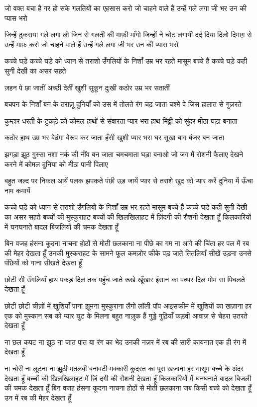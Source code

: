 जो वक्त बचा है गर हो सके
गलतियों का एहसास करो
जो चाहने वाले हैं उन्हें गले लगा
जी भर उन की प्यास भरो

जिन्हें ठुकराया गले लगा लो
जिन से गलती की माफ़ी माँगो
जिन्हों ने चोट लगायी दर्द दिया
दिलो दिमाग़ से उन्हें माफ़ करो
जो चाहने वाले हैं उन्हें गले लगा
जी भर उन की प्यास भरो
                           

कच्चे घड़े
कच्चे घड़े को ध्यान से तराशो
उँगलियों के निशाँ उम्र भर रहते
मासूम बच्चे हैं कच्चे घड़े
कही सुनी देखी का असर सहते

ज़हन पे छा जातीं
अच्छी देतीं खुशी सुकून
दुःखी कठोर उम्र भर सतातीं

बचपन के निशाँ बन के तराज़ू
दुनियाँ को उस में तोलते
रंग चढ़ जाता चश्मे पे
जिस हालात से गुज़रते

कुम्हार धरती के टुकड़े को
कोमल हाथों से संवारता
प्यार भरा हाथ मिट्टी को
सुंदर मीठा घड़ा बनाता

कठोर हाथ उम्र भर 
बेढंगा बेरूप कर जाता
हँसी खुशी प्यार भरा घर
सूखा बाग बंजर बन जाता

झगड़ा झूठ ग़ुस्सा नशा
नर्क की नींव बन जाता
चमचमाता घड़ा बनाओ
जो जग में रोशनी फैलाए
देखने करने में कोमल
दुनिया को मीठा पानी पिलाए

बहुत जल्द पर निकल आयें
पलक झपकते पंछी उड़ जायें
प्यार से तराशे खुद को प्यार करें
दुनिया में ऊँचा नाम कमायें

कच्चे घड़े को ध्यान से तराशो
उँगलियों के निशाँ उम्र भर रहते
मासूम बच्चे हैं कच्चे घड़े
कही सुनी देखी का असर सहते
बच्चों की मुस्कुराहट
बच्चों की खिलखिलाहट में ज़िंदगी की
रौशनी देखता हूँ
किलकारियों में घनघनाते बादल बिजलियों
की चमक देखता हूँ

बिन वजह हंसना कूदना नाचना
होठों से मोती छलकाना
ना पीछे का गम ना आगे की चिंता
हर पल में रब की मेहर देखता हूँ
उनकी मुस्कराहट के सामने
फूल कमज़ोर फीके पड़ जाते
तितलियाँ सीखें उड़ना उनसे
पंछियों को गाना सीखते देखता हूँ

छोटी सी उँगलियाँ हाथ पकड़
दिल तक पहुँच जाते
रूखे खूँखार इंसान का पत्थर दिल
मोम सा पिघलते देखता हूँ

छोटी छोटी चीज़ों में खुशियाँ पाना झूमना
मुस्कुराना
लैगो लॉली पॉप आइसक्रीम में खुशियों का
खज़ाना
हर एक को मुस्कान
सब को प्यार घुट के मिलना
बहुत नाज़ुक हैं गुड्डे गुढ़ियाँ
कड़वी आवाज़ से चेहरा उतरते देखता हूँ



ना छल कपट ना झूठ
ना जात पात या रंग का भेद
उनकी नज़र में रब की सारी कायनात
एक ही रंग में देखता हूँ

ना चोरी ना लूटना ना झूठी
मतलबी बनावटी मक्कारी
कुदरत का पूरा खज़ाना
हर मासूम बच्चे के अंदर देखता हूँ
बच्चों की खिलखिलाहट में ज़िं दगी की
रौशनी देखता हूँ
किलकारियों में घनघनाते बादल बिजली की
चमक देखता हूँ
बिन वजह हंसना कूदना नाचना होठों से मोती
छलकाना
जब किसी बच्चे को देखता हूँ
उन में रब की मेहर देखता हूँ

